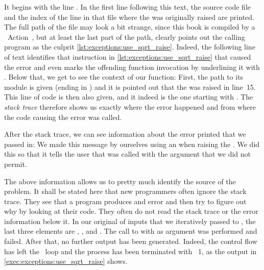 It begins with the line .
In the first line following this text, the source code file and the index of the line in that file where the  was originally raised are printed.
The full path of the file may look a bit strange, since this book is compiled by a \github\ Action~\cite{C2024GA}, but at least the last part of the path,  clearly points out the calling program as the culprit \cref{lst:exceptions:use_sqrt_raise}.
Indeed, the following line of text identifies that instruction in \cref{lst:exceptions:use_sqrt_raise} that caused the error and even marks the offending function invocation by underlining it with \textil{{^}{^}{^}{^}{^}{^}{^}{^}{^}{^}{^}{^}}.
Below that, we get to see the context of our  function:
First, the path to its module is given (ending in ) and it is pointed out that the  was raised in line~15.
This line of code is then also given, and it indeed is the one starting with .
The \emph{stack trace} therefore shows us exactly where the error happened and from where the code causing the error was called.%
%
\begin{sloppypar}%
After the stack trace, we can see information about the error printed that we passed in:
We made this message by ourselves using an  when raising the .
We did this so that it tells the user that  was called with the argument  that we did not permit.%
\end{sloppypar}%
%
The above information allows us to pretty much identify the source of the problem.
It shall be stated here that new programmers often ignore the stack trace.
They see that a program produces and error and then try to figure out why by looking at their code.
They often do not read the stack trace or the error information below it.%
%
%
%
In our original  of inputs that we iteratively passed to , the last three elements are , , and .
The call to  with  as argument was performed and failed.
After that, no further output has been generated.
Indeed, the control flow has left the ~loop and the process has been terminated with ~1, as the output in \cref{exec:exceptions:use_sqrt_raise} shows.

